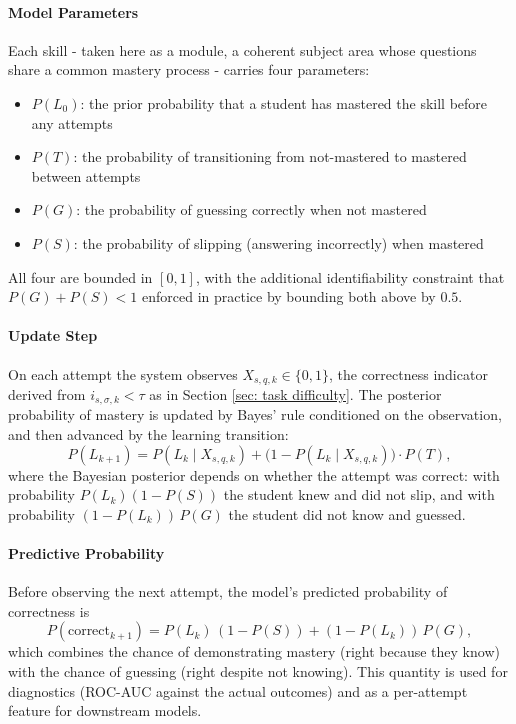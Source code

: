 \paragraph{Model Parameters}
Each skill - taken here as a module, a coherent subject area whose questions share a common mastery process - carries four parameters:
\begin{itemize}
    \item $P(L_0)$: the prior probability that a student has mastered the skill before any attempts
    \item $P(T)$: the probability of transitioning from not-mastered to mastered between attempts
    \item $P(G)$: the probability of guessing correctly when not mastered
    \item $P(S)$: the probability of slipping (answering incorrectly) when mastered
\end{itemize}
All four are bounded in $[0,1]$, with the additional identifiability constraint that $P(G) + P(S) < 1$ enforced in practice by bounding both above by $0.5$.

\paragraph{Update Step}
On each attempt the system observes $X_{s,q,k} \in \{0,1\}$, the correctness indicator derived from $i_{s,\sigma,k} < \tau$ as in Section \ref{sec: task difficulty}. 
The posterior probability of mastery is updated by Bayes' rule conditioned on the observation, and then advanced by the learning transition:
\begin{equation}
    P(L_{k+1})
    = P(L_k \mid X_{s,q,k})
      + \big(1 - P(L_k \mid X_{s,q,k})\big) \cdot P(T),
    \label{eq:bkt-update}
\end{equation}
where the Bayesian posterior depends on whether the attempt was correct: with probability $P(L_k)(1-P(S))$ the student knew and did not slip, and with probability $(1-P(L_k))\,P(G)$ the student did not know and guessed.

\paragraph{Predictive Probability}
Before observing the next attempt, the model's predicted probability of correctness is
\begin{equation}
    P(\text{correct}_{k+1})
    = P(L_k)\,(1 - P(S)) + (1 - P(L_k))\,P(G),
    \label{eq:bkt-predict}
\end{equation}
which combines the chance of demonstrating mastery (right because they know) with the chance of guessing (right despite not knowing). 
This quantity is used for diagnostics (ROC-AUC against the actual outcomes) and as a per-attempt feature for downstream models.

